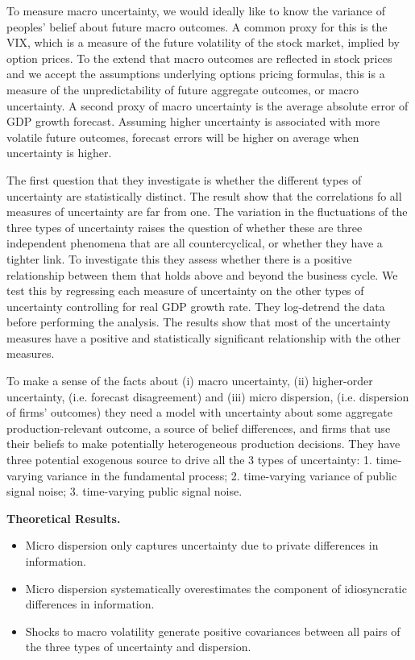 \documentclass{article}
\begin{document}
{To measure macro uncertainty, we would ideally like to know the variance of peoples' belief about future macro outcomes. A common proxy for this is the VIX, which is a measure of the future volatility of the stock market, implied by option prices. To the extend that macro outcomes are reflected in stock prices and we accept the assumptions underlying options pricing formulas, this is a measure of the unpredictability of future aggregate outcomes, or macro uncertainty. A second proxy of macro uncertainty is the average absolute error of GDP growth forecast. Assuming higher uncertainty is associated with more volatile future outcomes, forecast errors will be higher on average when uncertainty is higher.

The first question that they investigate is whether the different types of uncertainty are statistically distinct. The result show that the correlations fo all measures of uncertainty are far from one. The variation in the fluctuations of the three types of uncertainty raises the question of whether these are three independent phenomena that are all countercyclical, or whether they have a tighter link. To investigate this they assess whether there is a positive relationship between them that holds above and beyond the business cycle. We test this by regressing each measure of uncertainty on the other types of uncertainty controlling for real GDP growth rate. They log-detrend the data before performing the analysis. The results show that most of the uncertainty measures have a positive and statistically significant relationship with the other measures.

To make a sense of the facts about (i) macro uncertainty, (ii) higher-order uncertainty, (i.e. forecast disagreement) and (iii) micro dispersion, (i.e. dispersion of firms' outcomes) they need a model with uncertainty about some aggregate production-relevant outcome, a source of belief differences, and firms that use their beliefs to make potentially heterogeneous production decisions. They have three potential exogenous source to drive all the 3 types of uncertainty: 1. time-varying variance in the fundamental process; 2. time-varying variance of public signal noise; 3. time-varying public signal noise. 

\textbf{Theoretical Results.} 

\begin{itemize}
	\item Micro dispersion only captures uncertainty due to private differences in information.
	\item Micro dispersion systematically overestimates the component of idiosyncratic differences in information.
	\item Shocks to macro volatility generate positive covariances between all pairs of the three types of uncertainty and dispersion. 
\end{itemize}

}
\end{document}
